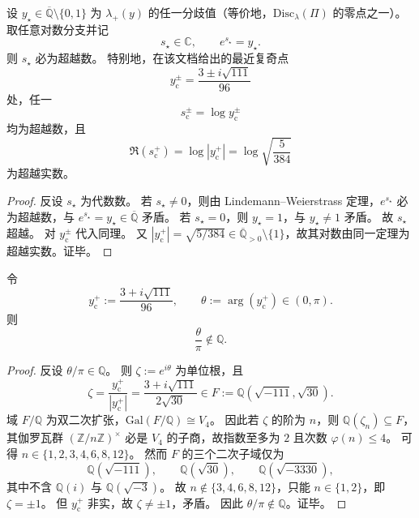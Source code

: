 \begin{theorem}\label{thm:xi-leyang-log-singularity-transcendence}
设 \(y_{\star}\in\overline{\mathbb Q}\setminus\{0,1\}\) 为 \(\lambda_+(y)\) 的任一分歧值（等价地，\(\mathrm{Disc}_{\lambda}(\Pi)\) 的零点之一）。
取任意对数分支并记
\[
s_{\star}\in\mathbb C,\qquad e^{s_{\star}}=y_{\star}.
\]
则 \(s_{\star}\) 必为超越数。
特别地，在该文档给出的最近复奇点
\[
y_{\mathrm c}^{\pm}=\frac{3\pm i\sqrt{111}}{96}
\]
处，任一
\[
s_{\mathrm c}^{\pm}=\log y_{\mathrm c}^{\pm}
\]
均为超越数，且
\[
\Re(s_{\mathrm c}^{+})
=\log|y_{\mathrm c}^{+}|
=\log\sqrt{\frac{5}{384}}
\]
为超越实数。
\end{theorem}
\begin{proof}
反设 \(s_{\star}\) 为代数数。
若 \(s_{\star}\neq0\)，则由 Lindemann--Weierstrass 定理，\(e^{s_{\star}}\) 必为超越数，与 \(e^{s_{\star}}=y_{\star}\in\overline{\mathbb Q}\) 矛盾。
若 \(s_{\star}=0\)，则 \(y_{\star}=1\)，与 \(y_{\star}\neq1\) 矛盾。
故 \(s_{\star}\) 超越。
对 \(y_{\mathrm c}^{\pm}\) 代入同理。
又 \(|y_{\mathrm c}^{+}|=\sqrt{5/384}\in\overline{\mathbb Q}_{>0}\setminus\{1\}\)，故其对数由同一定理为超越实数。证毕。
\end{proof}

\begin{proposition}\label{prop:xi-leyang-angle-over-pi-irrational}
令
\[
y_{\mathrm c}^{+}:=\frac{3+i\sqrt{111}}{96},
\qquad
\theta:=\arg(y_{\mathrm c}^{+})\in(0,\pi).
\]
则
\[
\frac{\theta}{\pi}\notin\mathbb Q.
\]
\end{proposition}
\begin{proof}
反设 \(\theta/\pi\in\mathbb Q\)。
则 \(\zeta:=e^{i\theta}\) 为单位根，且
\[
\zeta=\frac{y_{\mathrm c}^{+}}{|y_{\mathrm c}^{+}|}
=\frac{3+i\sqrt{111}}{2\sqrt{30}}
\in F:=\mathbb Q(\sqrt{-111},\sqrt{30}).
\]
域 \(F/\mathbb Q\) 为双二次扩张，\(\mathrm{Gal}(F/\mathbb Q)\cong V_4\)。
因此若 \(\zeta\) 的阶为 \(n\)，则 \(\mathbb Q(\zeta_n)\subseteq F\)，其伽罗瓦群 \((\mathbb Z/n\mathbb Z)^{\times}\) 必是 \(V_4\) 的子商，故指数至多为 \(2\) 且次数 \(\varphi(n)\le4\)。
可得 \(n\in\{1,2,3,4,6,8,12\}\)。
然而 \(F\) 的三个二次子域仅为
\[
\mathbb Q(\sqrt{-111}),\qquad
\mathbb Q(\sqrt{30}),\qquad
\mathbb Q(\sqrt{-3330}),
\]
其中不含 \(\mathbb Q(i)\) 与 \(\mathbb Q(\sqrt{-3})\)。
故 \(n\notin\{3,4,6,8,12\}\)，只能 \(n\in\{1,2\}\)，即 \(\zeta=\pm1\)。
但 \(y_{\mathrm c}^{+}\) 非实，故 \(\zeta\neq\pm1\)，矛盾。
因此 \(\theta/\pi\notin\mathbb Q\)。证毕。
\end{proof}


